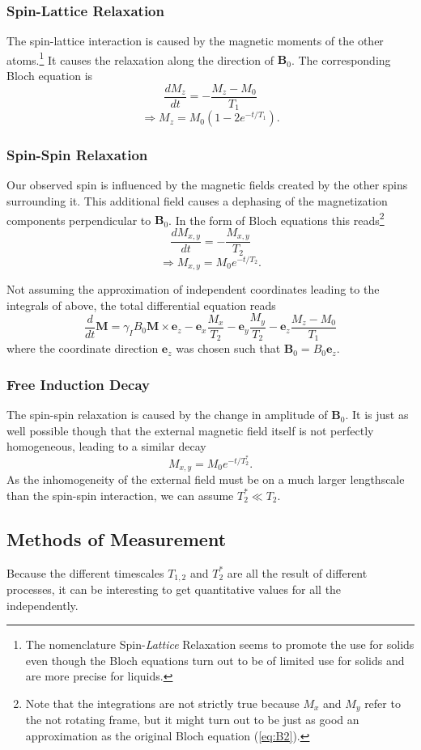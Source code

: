 \documentclass[a4paper]{scrartcl}
\numberwithin{equation}{section}
\numberwithin{figure}{section}
\numberwithin{table}{section}
\newcommand{\eq}[2]{\begin{equation}#1\label{#2}\end{equation}}
\newcommand{\ve}[1]{\mathbf{ #1} }
\begin{document}
\subsubsection*{Spin-Lattice Relaxation}
The spin-lattice interaction is caused by the magnetic moments of the other atoms.\footnote{The nomenclature Spin-\emph{Lattice} Relaxation seems to promote the use for solids even though the Bloch equations turn out to be of limited use for solids and are more precise for liquids.} It causes the relaxation along the direction of $\ve B_0$. The corresponding Bloch equation is
\eq{\frac{dM_z}{dt} = -\frac{M_z - M_0}{T_1}}{eq:B1}
\eq{\Rightarrow  M_z = M_0 \left(1 - 2e^{-t/T_1}\right) .}{}

\subsubsection*{Spin-Spin Relaxation}
Our observed spin is influenced by the magnetic fields created by the other spins surrounding it. This additional field causes a dephasing of the magnetization components perpendicular to $\ve B_0$. In the form of Bloch equations this reads\footnote{Note that the integrations are not strictly true because $M_x$ and $M_y$ refer to the not rotating frame, but it might turn out to be just as good an approximation as the original Bloch equation (\ref{eq:B2}).}
\eq{\frac{dM_{x,y}}{dt} = -\frac{M_{x,y}}{T_2}}{eq:B2}
\eq{\Rightarrow  M_{x,y}=M_0 e^{-t/T_2} .}{}

Not assuming the approximation of independent coordinates leading to the integrals of above, the total differential equation reads
\eq{\frac{d}{dt}\ve M = \gamma_I B_0 \ve M \times \ve e_z - \ve e_x \frac{M_x}{T_2} - \ve e_y \frac{M_y}{T_2} - \ve e_z \frac{M_z - M_0}{T_1} }{eq:Mtotal}
where the coordinate direction $\ve e_z$ was chosen such that $\ve B_0 = B_0 \ve e_z$.

\subsubsection*{Free Induction Decay}
The spin-spin relaxation is caused by the change in amplitude of $\ve B_0$. It is just as well possible though that the external magnetic field itself is not perfectly homogeneous, leading to a similar decay
\eq{M_{x,y} = M_0 e^{-t/T_2^*} .}{}
As the inhomogeneity of the external field must be on a much larger lengthscale than the spin-spin interaction, we can assume $T_2^* \ll T_2$.


\subsection{Methods of Measurement}
Because the different timescales $T_{1,2}$ and $T_2^*$ are all the result of different processes, it can be interesting to get quantitative values for all the independently.
\end{document}
